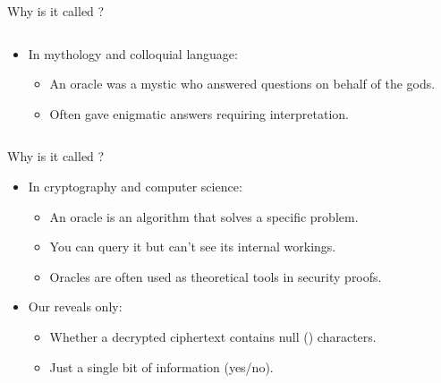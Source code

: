 \documentclass[aspectratio=169, lualatex, handout]{beamer}
\begin{document}
\begin{frame}{Why is it called ?}
	\begin{columns}[c]
		\begin{column}{0.5\textwidth}
			\begin{itemize}
				\item In mythology and colloquial language:
				      \begin{itemize}
					      \item An oracle was a mystic who answered questions on behalf of the gods.
					      \item Often gave enigmatic answers requiring interpretation.
				      \end{itemize}
			\end{itemize}
		\end{column}
		\begin{column}{0.5\textwidth}
			\vspace{-0.4cm}
		\end{column}
	\end{columns}
\end{frame}

\begin{frame}{Why is it called ?}
	\begin{itemize}
		\item In cryptography and computer science:
		      \begin{itemize}
			      \item An oracle is an algorithm that solves a specific problem.
			      \item You can query it but can't see its internal workings.
			      \item Oracles are often used as theoretical tools in security proofs.
		      \end{itemize}
		\item Our  reveals only:
		      \begin{itemize}
			      \item Whether a decrypted ciphertext contains null (\bit{0}) characters.
			      \item Just a single bit of information (yes/no).
		      \end{itemize}
	\end{itemize}
\end{frame}
\end{document}
